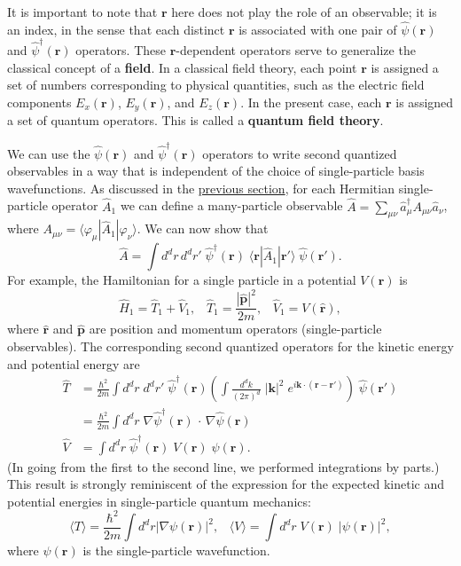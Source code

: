 \documentclass[pra,12pt]{revtex4}
\begin{document}
It is important to note that $\mathbf{r}$ here does not play the role
of an observable; it is an index, in the sense that each distinct
$\mathbf{r}$ is associated with one pair of $\hat{\psi}(\mathbf{r})$
and $\hat{\psi}^\dagger(\mathbf{r})$ operators.  These
$\mathbf{r}$-dependent operators serve to generalize the classical
concept of a \textbf{field}.  In a classical field theory, each point
$\mathbf{r}$ is assigned a set of numbers corresponding to physical
quantities, such as the electric field components $E_x(\mathbf{r})$,
$E_y(\mathbf{r})$, and $E_z(\mathbf{r})$.  In the present case, each
$\mathbf{r}$ is assigned a set of quantum operators.  This is called a
\textbf{quantum field theory}.

We can use the $\hat{\psi}(\mathbf{r})$ and
$\hat{\psi}^\dagger(\mathbf{r})$ operators to write second quantized
observables in a way that is independent of the choice of
single-particle basis wavefunctions.  As discussed in the
\hyperref[sec:second_quant_op]{previous section}, for each Hermitian
single-particle operator $\hat{A}_1$ we can define a many-particle
observable $\hat{A} = \sum_{\mu\nu} \hat{a}^\dagger_\mu A_{\mu\nu}
\hat{a}_\nu$, where $A_{\mu\nu} =
\langle\varphi_\mu|\hat{A}_1|\varphi_\nu\rangle$.  We can now show
that
$$\hat{A} = \int d^dr \,d^dr' \;\hat{\psi}^\dagger(\mathbf{r}) \;\langle \mathbf{r}|\hat{A}_1|\mathbf{r}'\rangle \; \hat{\psi}(\mathbf{r}').$$
For example, the Hamiltonian for a single particle in a potential
$V(\mathbf{r})$ is
$$\hat{H}_1 = \hat{T}_1 + \hat{V}_1, \;\;\; \hat{T}_1 = \frac{|\hat{\mathbf{p}}|^2}{2m}, \;\;\; \hat{V}_1 = V(\hat{\mathbf{r}}),$$
where $\hat{\mathbf{r}}$ and $\hat{\mathbf{p}}$ are position and
momentum operators (single-particle observables).  The corresponding
second quantized operators for the kinetic energy and potential energy
are
$$\begin{aligned}\hat{T} &= \frac{\hbar^2}{2m} \int d^dr\; d^dr'\; \hat{\psi}^\dagger(\mathbf{r}) \left(\int\frac{d^dk}{(2\pi)^d} \; |\mathbf{k}|^2 \; e^{i\mathbf{k}\cdot(\mathbf{r}-\mathbf{r}')}\right) \; \hat{\psi}(\mathbf{r}') \\ &= \frac{\hbar^2}{2m} \int d^d r\; \nabla \hat{\psi}^\dagger (\mathbf{r}) \, \cdot \, \nabla \hat{\psi}(\mathbf{r}) \\ \hat{V} &= \int d^dr \;\hat{\psi}^\dagger(\mathbf{r}) \;V(\mathbf{r}) \; \hat{\psi}(\mathbf{r}).\end{aligned}$$
(In going from the first to the second line, we performed integrations
by parts.)  This result is strongly reminiscent of the expression for
the expected kinetic and potential energies in single-particle quantum
mechanics:
$$\langle T\rangle = \frac{\hbar^2}{2m} \int d^d r \left|\nabla\psi(\mathbf{r})\right|^2, \;\;\; \langle V\rangle = \int d^dr \; V(\mathbf{r}) \; |\psi(\mathbf{r})|^2,$$
where $\psi(\mathbf{r})$ is the single-particle wavefunction.
\end{document}
